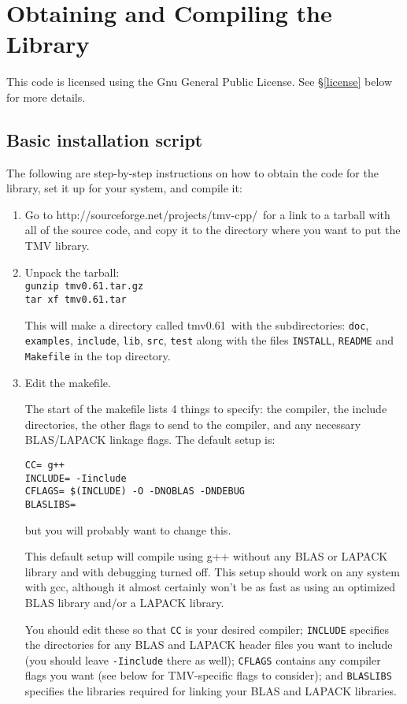 \documentclass[twoside,letterpaper,11pt]{article}
\renewcommand{\tt}[1]{{\texttt {#1}}}
\newcommand{\tmvversion}{0.61}
\newcommand{\website}{http://sourceforge.net/projects/tmv-cpp/}
\begin{document}
\newpage
\section{Obtaining and Compiling the Library}

This code is licensed using the Gnu General Public License.  See 
\S\ref{license} below for more details.

\subsection{Basic installation script}
The following are step-by-step instructions on how to obtain the code for the library,
set it up for your system, and compile it:
\begin{enumerate}

\item
Go to \website\ for a link to a tarball with all of the source code, and copy
it to the directory where you want to put the TMV library.

\item
Unpack the tarball:\\
\tt{gunzip tmv\tmvversion .tar.gz}\\
\tt{tar xf tmv\tmvversion .tar}

This will make a directory called tmv\tmvversion\ with the subdirectories:
\tt{doc}, \tt{examples}, \tt{include}, \tt{lib}, \tt{src}, \tt{test} 
along with the files \tt{INSTALL}, \tt{README} and \tt{Makefile} in the top 
directory.

\item
Edit the makefile.

The start of the makefile lists 4 things to specify: the compiler,
the include directories, the other flags to send to the compiler, 
and any necessary BLAS/LAPACK linkage flags.
The default setup is:
\begin{verbatim}
CC= g++
INCLUDE= -Iinclude
CFLAGS= $(INCLUDE) -O -DNOBLAS -DNDEBUG
BLASLIBS=
\end{verbatim}
but you will probably want to change this.

This default setup will compile using g++ without any BLAS or LAPACK library and 
with debugging turned off. 
This setup should work on any system with gcc, although it almost certainly 
won't be as fast as using an optimized BLAS library and/or a LAPACK library.

You should edit these so that \tt{CC} is your desired compiler; \tt{INCLUDE} specifies
the directories for any BLAS and LAPACK header files you want to include (you
should leave \tt{-Iinclude} there as well); \tt{CFLAGS} contains any compiler flags you
want (see below for TMV-specific flags to consider); and \tt{BLASLIBS} specifies
the libraries required for linking your BLAS and LAPACK libraries.


\end{enumerate}
\end{document}
